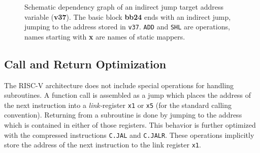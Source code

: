 \documentclass[course=eragp]{aspdoc}
\begin{document}
\begin{figure}
    \caption{
        Schematic dependency graph of an indirect jump target address variable (\textbf{v37}). The basic block \textbf{bb24} ends
        with an indirect jump, jumping to the address stored in \texttt{v37}. \texttt{ADD} and \texttt{SHL}
        are operations, names starting with \textbf{x} are names of static mappers.\\
    }\label{backtracking_graph}
\end{figure}

\subsection{Call and Return Optimization}
The RISC-V architecture does not include special operations for handling subroutines. A function call
is assembled as a jump which places the address of the next instruction into a \emph{link-}register
\texttt{x1} or \texttt{x5} (for the standard calling convention).\cite{rvspec} Returning from a
subroutine is done by jumping to the address which is contained in either of those registers. This
behavior is further optimized with the compressed instructions \texttt{C.JAL} and
\texttt{C.JALR}. These operations implicitly store the address of the next instruction
to the link register \texttt{x1}.\cite{rvspec}
\end{document}

